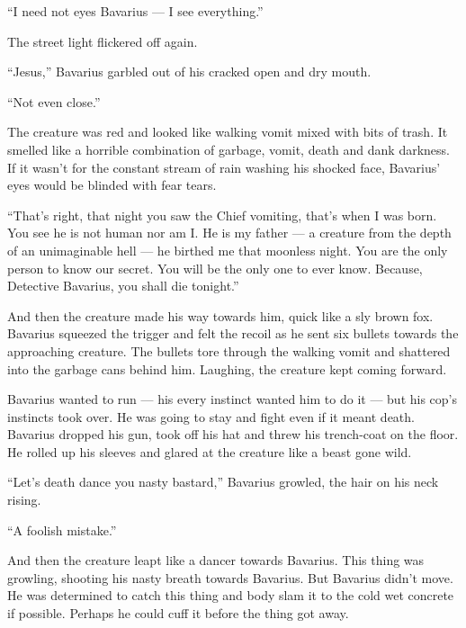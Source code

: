 ``I need not eyes Bavarius --- I see
everything.''



The street light flickered off again.



``Jesus,'' Bavarius garbled out of his cracked open and
dry mouth.



``Not even close.''



The creature was red and looked like walking vomit mixed with bits
of trash. It smelled like a horrible combination of garbage, vomit,
death and dank darkness. If it wasn't for the constant stream of
rain washing his shocked face, Bavarius' eyes would be blinded with
fear tears.



``That's right, that night you saw the Chief vomiting, that's
when I was born. You see he is not human nor am I. He is my father
--- a creature from the depth of an unimaginable hell ---
he birthed me that moonless night. You are the only person to know
our secret. You will be the only one to ever know. Because,
Detective Bavarius, you shall die tonight.''



And then the creature made his way towards him, quick like a sly
brown fox. Bavarius squeezed the trigger and felt the recoil as he
sent six bullets towards the approaching creature. The bullets tore
through the walking vomit and shattered into the garbage cans
behind him. Laughing, the creature kept coming forward.



Bavarius wanted to run --- his every instinct wanted him to do
it --- but his cop's instincts took over. He was going to stay
and fight even if it meant death. Bavarius dropped his gun, took
off his hat and threw his trench-coat on the floor. He rolled up
his sleeves and glared at the creature like a beast gone
wild.



``Let's death dance you nasty bastard,'' Bavarius
growled, the hair on his neck rising.



``A foolish mistake.''



And then the creature leapt like a dancer towards Bavarius. This
thing was growling, shooting his nasty breath towards Bavarius. But
Bavarius didn't move. He was determined to catch this thing and
body slam it to the cold wet concrete if possible. Perhaps he could
cuff it before the thing got away.



